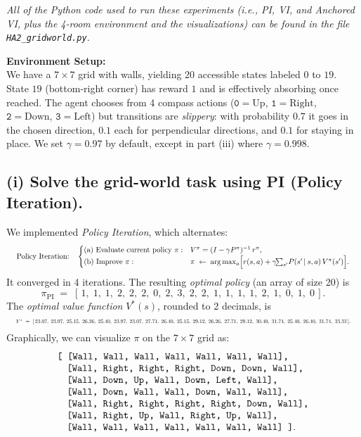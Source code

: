 \emph{All of the Python code used to run these experiments (i.e., PI, VI, and Anchored VI, 
plus the 4-room environment and the visualizations) can be found in the file 
\texttt{HA2\_gridworld.py}.}

\bigskip

\noindent
\textbf{Environment Setup:}\\
We have a \(7\times 7\) grid with walls, yielding 20 accessible states labeled
\(0\) to \(19\). State \(19\) (bottom-right corner) has reward \(1\) and 
is effectively absorbing once reached. The agent chooses from 4 compass actions 
(\(\mathtt{0}=\text{Up}\), \(\mathtt{1}=\text{Right}\), 
\(\mathtt{2}=\text{Down}\), \(\mathtt{3}=\text{Left}\)) but transitions are 
\emph{slippery}: with probability \(0.7\) it goes in the chosen direction, 
\(0.1\) each for perpendicular directions, and \(0.1\) for staying in place. 
We set \(\gamma=0.97\) by default, except in part (iii) where \(\gamma=0.998\).

\subsection*{(i) Solve the grid-world task using PI (Policy Iteration).}

\noindent
We implemented \emph{Policy Iteration}, which alternates:
\[
  \resizebox{\textwidth}{!}{
  $\text{Policy Iteration:}\quad
  \begin{cases}
    \text{(a) Evaluate current policy }\pi: 
      & V^\pi = (I - \gamma P^\pi)^{-1} \, r^\pi,\\
    \text{(b) Improve } \pi: & 
      \pi \; \leftarrow \; \arg\max_{a} 
        \Bigl[r(s,a)+\gamma\!\!\sum_{s'}\!P(s'\!\mid s,a)\,V^\pi(s')\Bigr].
  \end{cases}$
  }
\]
It converged in 4 iterations. The resulting \emph{optimal policy} (an array of size 20) is
\[
  \pi_{\mathrm{PI}} \;=\; 
  [\,1,\;1,\;1,\;2,\;2,\;2,\;0,\;2,\;3,\;2,\;2,\;1,\;1,\;1,\;1,\;2,\;1,\;0,\;1,\;0\,].
\]
The \emph{optimal value function} \(V^*(s)\), rounded to 2 decimals, is
\[
  \resizebox{\textwidth}{!}{
  $V^* \;=\;
  [\,23.07,\;23.97,\;25.15,\;26.26,\;25.40,\;23.97,\;23.07,\;27.71,\;26.40,\;25.15,\;
    29.12,\;26.26,\;27.71,\;29.12,\;30.40,\;31.74,\;25.40,\;26.40,\;31.74,\;33.33\,].$
  }
\]
Graphically, we can visualize \(\pi\) on the \(7\times 7\) grid as:
\[
\begin{array}{l}
\text{\ttfamily
[ [Wall,  Wall,  Wall,  Wall,  Wall,  Wall,  Wall],}\\
\quad \text{\ttfamily [Wall, Right, Right, Right, Down, Down, Wall],}\\
\quad \text{\ttfamily [Wall, Down,  Up,   Wall,  Down, Left,  Wall],}\\
\quad \text{\ttfamily [Wall, Down,  Wall,  Wall,  Down, Wall,  Wall],}\\
\quad \text{\ttfamily [Wall, Right, Right, Right, Right, Down, Wall],}\\
\quad \text{\ttfamily [Wall, Right, Up,   Wall,  Right, Up,   Wall],}\\
\quad \text{\ttfamily [Wall, Wall,  Wall,  Wall,  Wall, Wall,  Wall] ]}.
\end{array}
\]

